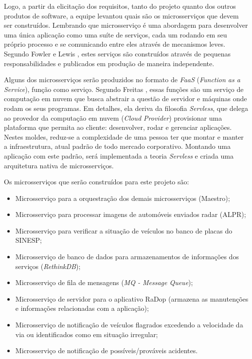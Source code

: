 Logo, a partir da elicitação dos requisitos, tanto do projeto quanto dos outros produtos de software, a equipe levantou quais são os microsserviços que devem ser construídos. Lembrando que microsserviço é uma abordagem para desenvolver uma única aplicação como uma suíte de serviços, cada um rodando em seu próprio processo e se comunicando entre eles através de mecanismos leves. Segundo Fowler e Lewis \cite{fowler2015}, estes serviços são construídos através de pequenas responsabilidades e publicados em produção de maneira independente.

Alguns dos microsserviços serão produzidos no formato de \textit{FaaS} (\textit{Function as a Service}), função como serviço. Segundo Freitas \cite{freitas2018}, essas funções são um serviço de computação em nuvem que busca abstrair a questão de servidor e máquinas onde rodam os seus programas. Em detalhes, ela deriva da filosofia \textit{Servless}, que delega ao provedor da computação em nuvem (\textit{Cloud Provider}) provisionar uma plataforma que permita ao cliente: desenvolver, rodar e gerenciar aplicações. Nestes moldes, reduz-se a complexidade de uma pessoa ter que montar e manter a infraestrutura, atual padrão de todo mercado corporativo. Montando uma aplicação com este padrão, será implementada a teoria \textit{Servless} e criada uma arquitetura nativa de microsserviços.

Os microsserviços que serão construídos para este projeto são:

\begin{itemize}
    \item Microsserviço para a orquestração dos demais microsserviços (Maestro);
    \item Microsserviço para processar imagens de automóveis enviados radar (ALPR);
    \item Microsserviço para verificar a situação de veículos no banco de placas do SINESP;
    \item Microsserviço de banco de dados para armazenamentos de informações dos serviços (\textit{RethinkDB});
    \item Microsserviço de fila de mensagens (\textit{MQ - Message Queue});
    \item Microsserviço de servidor para o aplicativo RaDop (armazena as manutenções e informações relacionadas com a aplicação);
    \item Microsserviço de notificação de veículos flagrados excedendo a velocidade da via ou identificados como em situação irregular;
    \item Microsserviço de notificação de possíveis/prováveis acidentes.
\end{itemize}

